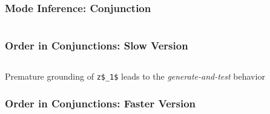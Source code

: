 \documentclass[xcolor=table, aspectratio=169]{beamer}
\begin{document}
\begin{frame}[fragile]
  \frametitle{Mode Inference: Conjunction}
\begin{columns}
  \begin{column}[t]{0.33\textwidth}
     \pause
  \end{column}
  \begin{column}[t]{0.33\textwidth}
     \pause
  \end{column}
  \begin{column}[t]{0.33\textwidth}
    
  \end{column}
\end{columns}
\end{frame}

\begin{frame}[fragile]
  \frametitle{Order in Conjunctions: Slow Version}

\begin{columns}
  \begin{column}[t]{0.4\textwidth}
    
  \end{column}
  \begin{column}[t]{0.55\textwidth}
    
  \end{column}
\end{columns}

\begin{center}
  Premature grounding of \lstinline{z$_1$} leads to the \emph{generate-and-test} behavior
\end{center}

\end{frame}


\begin{frame}[fragile]
  \frametitle{Order in Conjunctions: Faster Version}

\begin{columns}
  \begin{column}[t]{0.4\textwidth}
    
  \end{column}
  \begin{column}[t]{0.55\textwidth}
    
  \end{column}
\end{columns}
\end{frame}
\end{document}
